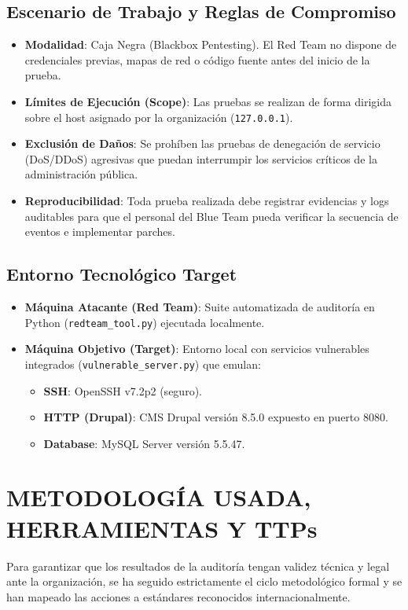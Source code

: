 \documentclass[11pt,a4paper]{article}
\begin{document}
\subsection{Escenario de Trabajo y Reglas de Compromiso}
\begin{itemize}
    \item \textbf{Modalidad}: Caja Negra (Blackbox Pentesting). El Red Team no dispone de credenciales previas, mapas de red o código fuente antes del inicio de la prueba.
    \item \textbf{Límites de Ejecución (Scope)}: Las pruebas se realizan de forma dirigida sobre el host asignado por la organización (\texttt{127.0.0.1}).
    \item \textbf{Exclusión de Daños}: Se prohíben las pruebas de denegación de servicio (DoS/DDoS) agresivas que puedan interrumpir los servicios críticos de la administración pública.
    \item \textbf{Reproducibilidad}: Toda prueba realizada debe registrar evidencias y logs auditables para que el personal del Blue Team pueda verificar la secuencia de eventos e implementar parches.
\end{itemize}

\subsection{Entorno Tecnológico Target}
\begin{itemize}
    \item \textbf{Máquina Atacante (Red Team)}: Suite automatizada de auditoría en Python (\texttt{redteam\_tool.py}) ejecutada localmente.
    \item \textbf{Máquina Objetivo (Target)}: Entorno local con servicios vulnerables integrados (\texttt{vulnerable\_server.py}) que emulan:
    \begin{itemize}
        \item \textbf{SSH}: OpenSSH v7.2p2 (seguro).
        \item \textbf{HTTP (Drupal)}: CMS Drupal versión 8.5.0 expuesto en puerto 8080.
        \item \textbf{Database}: MySQL Server versión 5.5.47.
    \end{itemize}
\end{itemize}


\section{METODOLOGÍA USADA, HERRAMIENTAS Y TTPs}
Para garantizar que los resultados de la auditoría tengan validez técnica y legal ante la organización, se ha seguido estrictamente el ciclo metodológico formal y se han mapeado las acciones a estándares reconocidos internacionalmente.
\end{document}
